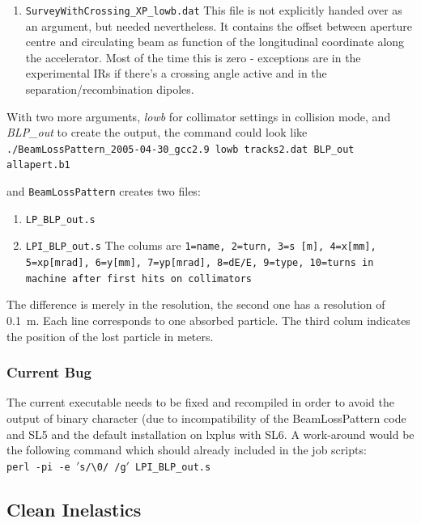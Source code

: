 \documentclass[a4paper, oneside, final]{scrartcl}
\begin{document}
{{{\begin{enumerate}
as a function of $s$. 

\item \texttt{SurveyWithCrossing\_XP\_lowb.dat} This file is not explicitly handed over as an argument, but needed nevertheless. It contains the offset between aperture centre and circulating beam as function of the longitudinal coordinate along the accelerator. Most of the time this is zero - exceptions are in the experimental IRs if there's a crossing angle active and in the separation/recombination dipoles.
\end{enumerate}

With two more arguments, \textit{lowb} for collimator settings in collision mode, and \textit{BLP\_out} to create the output, the command could look like \\

\texttt{./BeamLossPattern\_2005-04-30\_gcc2.9 lowb tracks2.dat BLP\_out allapert.b1}\newline

and \texttt{BeamLossPattern} creates two files:

\begin{enumerate}
\item \texttt{LP\_BLP\_out.s}
\item \texttt{LPI\_BLP\_out.s} The colums are \texttt{1=name, 2=turn, 3=s [m], 4=x[mm], 5=xp[mrad], 6=y[mm], 7=yp[mrad], 8=dE/E, 9=type, 10=turns in machine after first hits on collimators}
\end{enumerate}
The difference is merely in the resolution, the second one has a resolution of 0.1~m. Each line corresponds to one absorbed particle. The third colum indicates the position of the lost particle in meters. 

\subsubsection{Current Bug}
The current executable needs to be fixed and recompiled in order to avoid the output of binary character (due to incompatibility of the BeamLossPattern code and SL5 and the default installation on lxplus with SL6. A work-around would be the following command which should already included in the job scripts:\\
\texttt{perl -pi -e $'$s/\textbackslash0/ /g$'$ LPI\_BLP\_out.s}


\subsection{Clean Inelastics}

}}}
\end{document}
